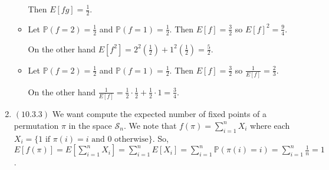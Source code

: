 \documentclass[12pt]{article}
\begin{document}
\begin{enumerate}[start=1,label={\bfseries Problem \arabic*:},leftmargin=1in]
\begin{itemize}
        Then $E[fg] = \frac{1}{2}$.

        \item Let $\mathbb{P}(f = 2) = \frac{1}{2}$ and $\mathbb{P}(f = 1) = \frac{1}{2}$. 
        Then $E[f] = \frac{3}{2}$ so $E[f]^2 = \frac{9}{4}$. 
        
        On the other hand $E[f^2] = 2^2 (\frac{1}{2}) + 1^2 (\frac{1}{2}) = \frac{5}{2}$.

        \item Let $\mathbb{P}(f = 2) = \frac{1}{2}$ and $\mathbb{P}(f = 1) = \frac{1}{2}$. 
        Then $E[f] = \frac{3}{2}$ so $\frac{1}{E[f]}= \frac{2}{3}$.

        On the other hand $\frac{1}{E[f]} = \frac{1}{2} \cdot \frac{1}{2} + \frac{1}{2} \cdot 1 = \frac{3}{4}$.

    \end{itemize}
    \item $(10.3.3)$ We want compute the expected number of fixed points of a permutation $\pi$ in the space $\mathcal{S}_n$.
    We note that $f(\pi) = \sum_{i = 1}^{n} X_{i}$ where each $X_{i} = \{ 1 \text{ if } \pi(i) = i \text{ and } 0 \text{ otherwise} \}$.
    So, $E[f(\pi)] = E[\sum_{i = 1}^{n} X_{i}] = \sum_{i = 1}^{n} E[X_{i}] = \sum_{i = 1}^{n} \mathbb{P}(\pi(i) = i) = \sum_{i = 1}^{n} \frac{1}{n} = 1$.

\end{enumerate}
\end{document}
